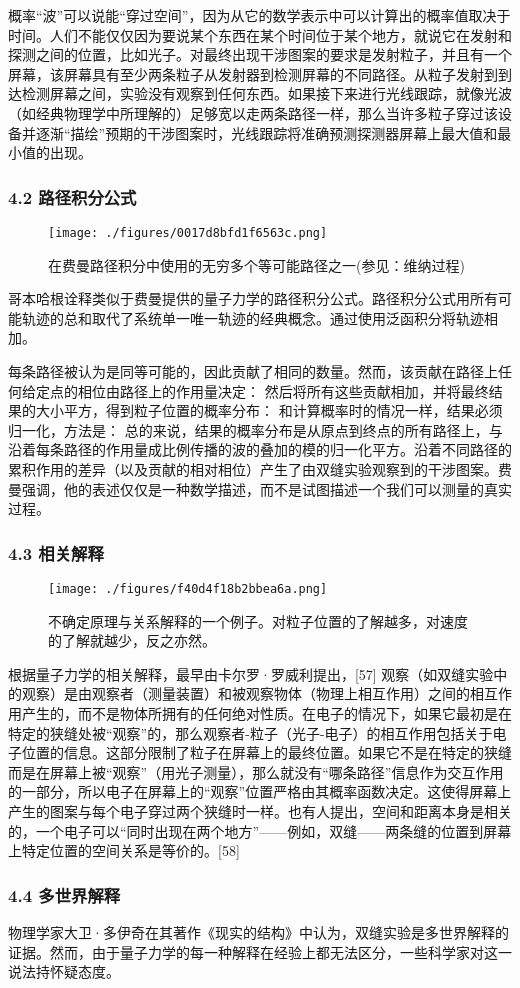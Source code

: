 概率“波”可以说能“穿过空间”，因为从它的数学表示中可以计算出的概率值取决于时间。人们不能仅仅因为要说某个东西在某个时间位于某个地方，就说它在发射和探测之间的位置，比如光子。对最终出现干涉图案的要求是发射粒子，并且有一个屏幕，该屏幕具有至少两条粒子从发射器到检测屏幕的不同路径。从粒子发射到到达检测屏幕之间，实验没有观察到任何东西。如果接下来进行光线跟踪，就像光波（如经典物理学中所理解的）足够宽以走两条路径一样，那么当许多粒子穿过该设备并逐渐“描绘”预期的干涉图案时，光线跟踪将准确预测探测器屏幕上最大值和最小值的出现。
\subsubsection{4.2 路径积分公式}
\begin{figure}[ht]
\centering
\texttt{[image: ./figures/0017d8bfd1f6563c.png]}
\caption{在费曼路径积分中使用的无穷多个等可能路径之一(参见：维纳过程)} \label{fig_SFSY_8}
\end{figure}
哥本哈根诠释类似于费曼提供的量子力学的路径积分公式。路径积分公式用所有可能轨迹的总和取代了系统单一唯一轨迹的经典概念。通过使用泛函积分将轨迹相加。

每条路径被认为是同等可能的，因此贡献了相同的数量。然而，该贡献在路径上任何给定点的相位由路径上的作用量决定：
然后将所有这些贡献相加，并将最终结果的大小平方，得到粒子位置的概率分布：
和计算概率时的情况一样，结果必须归一化，方法是：
总的来说，结果的概率分布是从原点到终点的所有路径上，与沿着每条路径的作用量成比例传播的波的叠加的模的归一化平方。沿着不同路径的累积作用的差异（以及贡献的相对相位）产生了由双缝实验观察到的干涉图案。费曼强调，他的表述仅仅是一种数学描述，而不是试图描述一个我们可以测量的真实过程。
\subsubsection{4.3 相关解释}
\begin{figure}[ht]
\centering
\texttt{[image: ./figures/f40d4f18b2bbea6a.png]}
\caption{不确定原理与关系解释的一个例子。对粒子位置的了解越多，对速度的了解就越少，反之亦然。} \label{fig_SFSY_9}
\end{figure}
根据量子力学的相关解释，最早由卡尔罗·罗威利提出，[57] 观察（如双缝实验中的观察）是由观察者（测量装置）和被观察物体（物理上相互作用）之间的相互作用产生的，而不是物体所拥有的任何绝对性质。在电子的情况下，如果它最初是在特定的狭缝处被“观察”的，那么观察者-粒子（光子-电子）的相互作用包括关于电子位置的信息。这部分限制了粒子在屏幕上的最终位置。如果它不是在特定的狭缝而是在屏幕上被“观察”（用光子测量），那么就没有“哪条路径”信息作为交互作用的一部分，所以电子在屏幕上的“观察”位置严格由其概率函数决定。这使得屏幕上产生的图案与每个电子穿过两个狭缝时一样。也有人提出，空间和距离本身是相关的，一个电子可以“同时出现在两个地方”——例如，双缝——两条缝的位置到屏幕上特定位置的空间关系是等价的。[58]
\subsubsection{4.4 多世界解释}
物理学家大卫·多伊奇在其著作《现实的结构》中认为，双缝实验是多世界解释的证据。然而，由于量子力学的每一种解释在经验上都无法区分，一些科学家对这一说法持怀疑态度。